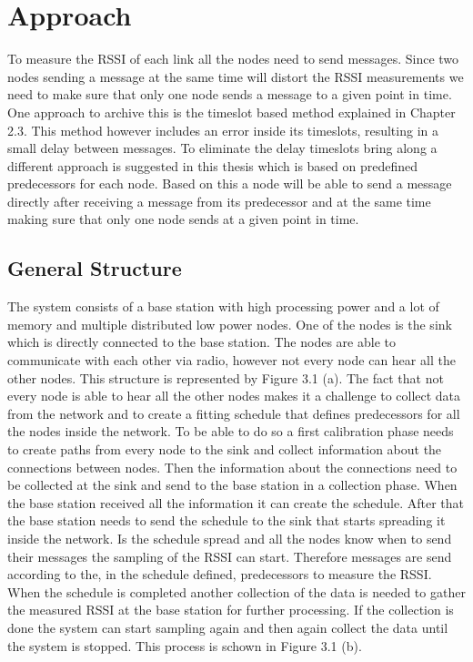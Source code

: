 \chapter{Approach}
To measure the RSSI of each link all the nodes need to send messages. Since two nodes sending a message at the same time will distort the RSSI measurements we need to make sure that only one node sends a message to a given point in time. One approach to archive this is the timeslot based method explained in Chapter 2.3. This method however includes an error inside its timeslots, resulting in a small delay between messages.
To eliminate the delay timeslots bring along a different approach is suggested in this thesis which is based on predefined predecessors for each node. Based on this a node will be able to send a message directly after receiving a message from its predecessor and at the same time making sure that only one node sends at a given point in time.

\section{General Structure}

The system consists of a base station with high processing power and a lot of memory and multiple distributed low power nodes. One of the nodes is the sink which is directly connected to the base station. The nodes are able to communicate with each other via radio, however not every node can hear all the other nodes. This structure is represented by Figure 3.1 (a). The fact that not every node is able to hear all the other nodes makes it a challenge to collect data from the network and to create a fitting schedule that defines predecessors for all the nodes inside the network. To be able to do so a first calibration phase needs to create paths from every node to the sink and collect information about the connections between nodes. Then the information about the connections need to be collected at the sink and send to the base station in a collection phase. When the base station received all the information it can create the schedule. After that the base station needs to send the schedule to the sink that starts spreading it inside the network. Is the schedule spread and all the nodes know when to send their messages the sampling of the RSSI can start. Therefore messages are send according to the, in the schedule defined, predecessors to measure the RSSI. When the schedule is completed another collection of the data is needed to gather the measured RSSI at the base station for further processing. If the collection is done the system can start sampling again and then again collect the data until the system is stopped. This process is schown in Figure 3.1 (b).    

